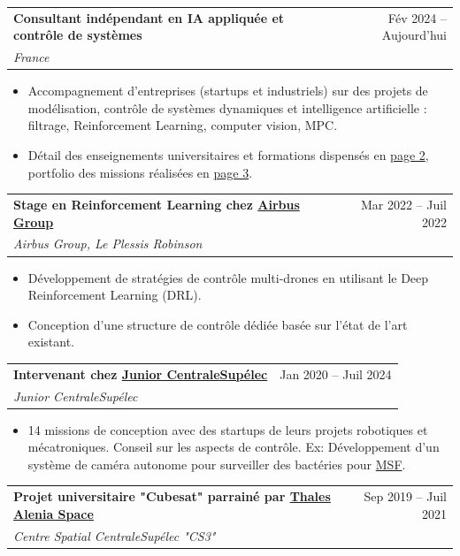 \documentclass[letterpaper,11pt]{article}
\makeatletter
\newcommand{\resumeItem}[1]{
  \item\small{
    {#1 \vspace{-7pt}}
  }
}
\newcommand{\resumeSubheading}[4]{
  \vspace{-3pt}\item
    \begin{tabular*}{0.97\textwidth}[t]{l@{\extracolsep{\fill}}r}
      \textbf{#1} & #2 \\
      \textit{\small#3} & \textit{\small #4} \\
    \end{tabular*}\vspace{-7pt}
}
\newcommand{\resumeItemListStart}{\begin{itemize}}
\newcommand{\resumeItemListEnd}{\end{itemize}\vspace{-3pt}}
\makeatother
\begin{document}
 \resumeSubheading
          {Consultant indépendant en IA appliquée et contrôle de systèmes}{Fév 2024 -- Aujourd'hui}{France}{}
          \vspace{1pt}
          \resumeItemListStart
          \resumeItem{Accompagnement d'entreprises (startups et industriels) sur des projets de modélisation, contrôle de systèmes dynamiques et intelligence artificielle : filtrage, Reinforcement Learning, computer vision, MPC.}
          \vspace{5pt}
          \resumeItem{Détail des enseignements universitaires et formations dispensés en \hyperlink{enseignements}{page 2}, portfolio des missions réalisées en \hyperlink{portfolio}{page 3}.}
          \vspace{6pt}
\resumeItemListEnd

\vspace{-12pt}

 \resumeSubheading
          {Stage en Reinforcement Learning chez \underline{Airbus Group} \vspace{-2pt}}{Mar 2022 -- Juil 2022}{Airbus Group, Le Plessis Robinson}{}

          \resumeItemListStart
          \resumeItem{ Développement de stratégies de contrôle multi-drones en utilisant le Deep Reinforcement Learning (DRL).}
        \vspace{5pt}
         \resumeItem{Conception d’une structure de contrôle dédiée basée sur l’état de l’art existant.}
          \vspace{6pt}
    \resumeItemListEnd

\resumeSubheading
{Intervenant chez \underline{Junior CentraleSupélec} \vspace{-2pt}}{Jan 2020 -- Juil 2024}{Junior CentraleSupélec}{}

\resumeItemListStart
    \resumeItem{14 missions de conception avec des startups de leurs projets robotiques et mécatroniques.
Conseil sur les aspects de contrôle. Ex: Développement d'un système de caméra autonome pour surveiller des bactéries pour \underline{MSF}.}
    \vspace{6pt}
\resumeItemListEnd
      
\resumeSubheading
      {Projet universitaire "Cubesat" parrainé par \underline{Thales Alenia Space} \vspace{-2pt}}{Sep 2019 -- Juil 2021}{Centre Spatial CentraleSupélec "CS3"}{}
      
\end{document}

